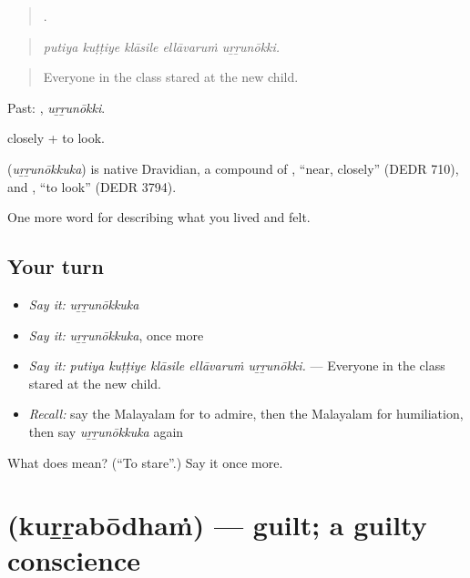 \begin{quote}
    .
\end{quote}

\begin{quote}
\emph{putiya kuṭṭiye klāsile ellāvaruṁ uṟṟunōkki.}
\end{quote}

\begin{quote}
Everyone in the class stared at the new child.
\end{quote}

Past: , \emph{uṟṟunōkki}.

 closely +  to look.

\begin{cousinweb}
\textbf{} (\emph{uṟṟunōkkuka}) is native Dravidian, a compound of , \textquotedblleft{}near, closely\textquotedblright{} (DEDR 710), and , \textquotedblleft{}to look\textquotedblright{} (DEDR 3794).
\end{cousinweb}

\begin{grammarlens}[title={What you've built}]
One more word for describing what you lived and felt.
\end{grammarlens}

\subsection*{Your turn}
\begin{itemize}
\raggedright
  \item \emph{Say it:} \emph{uṟṟunōkkuka}
  \item \emph{Say it:} \emph{uṟṟunōkkuka}, once more
  \item \emph{Say it:} \emph{putiya kuṭṭiye klāsile ellāvaruṁ uṟṟunōkki.} — Everyone in the class stared at the new child.
  \item \emph{Recall:} say the Malayalam for to admire, then the Malayalam for humiliation, then say \emph{uṟṟunōkkuka} again
\end{itemize}

\begin{tcolorbox}[breakable,colback=teal!4,colframe=teal!35!black,title={Before you move on}]
What does  mean? (\textquotedblleft{}To stare\textquotedblright{}.) Say it once more.
\end{tcolorbox}
\section[\texorpdfstring{\ml{കുറ്റബോധം} (kuṟṟabōdhaṁ)}{കുറ്റബോധം (kuṟṟabōdhaṁ)}]{ (kuṟṟabōdhaṁ) — guilt; a guilty conscience}

